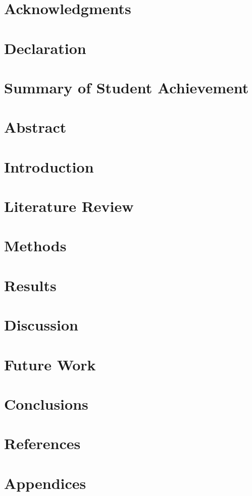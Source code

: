 \documentclass[12pt]{article}
\begin{document}

\restoregeometry

\section*{Acknowledgments}

\pagebreak

\section*{Declaration}

\pagebreak

\section*{Summary of Student Achievement}

\pagebreak

\setcounter{tocdepth}{5}
\tableofcontents
\pagebreak

\listoffigures
\listoftables
\pagebreak

\justify

\section*{Abstract}

\pagebreak

\section{Introduction}


\section{Literature Review}


\section{Methods}


\section{Results}


\section{Discussion}


\section{Future Work}


\section{Conclusions}




\section{References}
\label{sec:ref}
\printbibliography[heading=none]

\section{Appendices}

\end{document}
